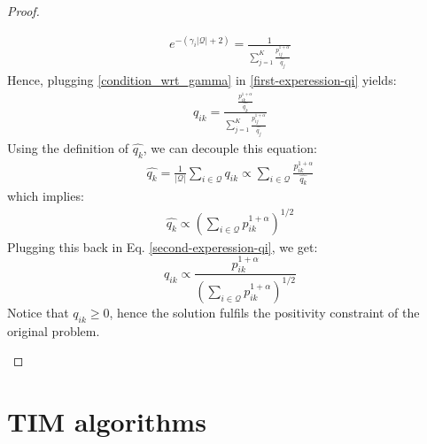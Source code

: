 \documentclass{article}
\begin{document}
\begin{proof}
\begin{itemize}
    		        \begin{align}
    		        \label{condition_wrt_gamma}
e^{-(\gamma_i |\mathcal{Q}|+2)} = \frac{1}{\displaystyle \sum_{j=1}^K \frac{p_{ij}^{1+\alpha}}{\widehat{q_j}}}
    		        \end{align}
    		        Hence, plugging \eqref{condition_wrt_gamma} in \eqref{first-experession-qi} yields:
    		        \begin{align}
    		        \label{second-experession-qi}
    		            q_{ik} = \frac{\displaystyle \frac{p_{ik}^{1+\alpha}}{\widehat{q_k}}}{\displaystyle \sum_{j=1}^K \frac{p_{ij}^{1+\alpha}}{\widehat{q_j}}}
    		        \end{align}
    		        Using the definition of $\widehat{q_k}$, we can decouple this equation:
    		        \begin{align}\label{eq:update_proof_2}
    		            \widehat{q_k} = \frac{1}{|\mathcal{Q}|} \sum_{i \in \mathcal{Q}} q_{ik} \propto \sum_{i \in \mathcal{Q}} \frac{p_{ik}^{1+\alpha}}{\widehat{q_k}}
    		        \end{align}
    		        which implies:
    		        \begin{align}
    		            \widehat{q_k} \propto \left (\sum_{i \in \mathcal{Q}} p_{ik}^{1+\alpha} \right )^{1/2}
    		        \end{align}
    		        Plugging this back in Eq. \eqref{second-experession-qi}, we get:
    		        \begin{equation}
    		        \label{third-experession-qi}
    		            q_{ik} \propto \frac{p_{ik}^{1+\alpha}}{\left (\displaystyle \sum_{i \in \mathcal{Q}} p_{ik}^{1+\alpha} \right )^{1/2}}
    		        \end{equation}
    		        Notice that $q_{ik} \geq 0$, hence the solution fulfils the positivity constraint of the original problem.
            \end{itemize}
        \end{proof}

\section{TIM algorithms}\label{sec:algorithms}
    
\end{document}
